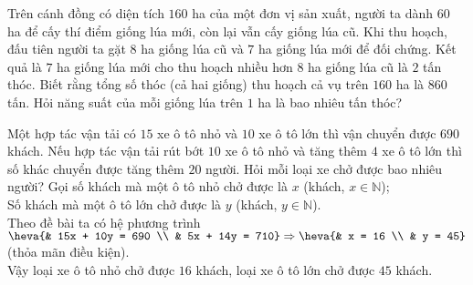 \begin{bt}
	Trên cánh đồng có diện tích $160$ ha của một đơn vị sản xuất, người ta dành $60$ ha để cấy thí điểm giống lúa mới, còn lại vẫn cấy giống lúa cũ. Khi thu hoạch, đấu tiên người ta gặt $8$ ha giống lúa cũ và $7$ ha giống lúa mới để đối chứng. Kết quả là $7$ ha giống lúa mới cho thu hoạch nhiều hơn $8$ ha giống lúa cũ là $2$ tấn thóc. Biết rằng tổng số thóc (cả hai giống) thu hoạch cả vụ trên $160$ ha là $860$ tấn. Hỏi năng suất của mỗi giống lúa trên $1$ ha là bao nhiêu tấn thóc?
\end{bt}
\begin{bt}%
	Một hợp tác vận tải có $15$ xe ô tô nhỏ và $10$ xe ô tô lớn thì vận chuyển được $690$ khách. Nếu hợp tác vận tải rút bớt $10$ xe ô tô nhỏ và tăng thêm $4$ xe ô tô lớn thì số khác chuyển được tăng thêm $20$ người. Hỏi mỗi loại xe chở được bao nhiêu người?
	\loigiai
	{
	Gọi số khách mà một ô tô nhỏ chở được là $x$ (khách, $x \in \mathbb{N}$);\\
	Số khách mà một ô tô lớn chở được là $y$ (khách, $y 
	\in \mathbb{N}$).\\
	Theo đề bài ta có hệ phương trình $\heva{& 15x + 10y = 690 \\ & 5x + 14y = 710} \Rightarrow \heva{& x = 16 \\ & y = 45}$ (thỏa mãn điều kiện).\\
	Vậy loại xe ô tô nhỏ chở được $16$ khách, loại xe ô tô lớn chở được $45$ khách.
	}
\end{bt}
